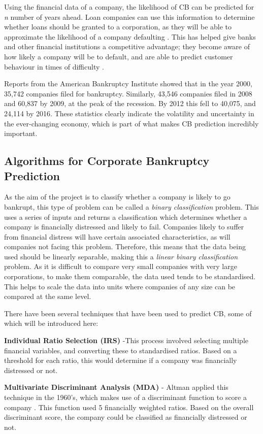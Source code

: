 \documentclass[11pt]{article}
\begin{document}
Using the financial data of a company, the likelihood of CB can be predicted for \textit{n} number of years ahead. 
Loan companies can use this information to determine whether loans should be granted to a corporation, as they will be able to approximate the likelihood of a company defaulting \cite{ref-four}. This has helped give banks and other financial institutions a competitive advantage; they become aware of how likely a company will be to default, and are able to predict customer behaviour in times of difficulty \cite{ref-four}.

Reports from the American Bankruptcy Institute \cite{ref-five} showed that in the year 2000, 35,742 companies filed for bankruptcy. Similarly, 43,546 companies filed in 2008 and 60,837 by 2009, at the peak of the recession. By 2012 this fell to 40,075, and 24,114 by 2016. These statistics clearly indicate the volatility and uncertainty in the ever-changing economy, which is part of what makes CB prediction incredibly important.
\subsection{Algorithms for Corporate Bankruptcy Prediction}\label{subsec:algos}
As the aim of the project is to classify whether a company is likely to go bankrupt, this type of problem can be called a \textit{binary classification} problem. This uses a series of inputs and returns a classification which determines whether a company is financially distressed and likely to fail. Companies likely to suffer from financial distress will have certain associated characteristics, as will companies not facing this problem. Therefore, this means that the data being used should be linearly separable, making this a \textit{linear binary classification} problem. As it is difficult to compare very small companies with very large corporations, to make them comparable, the data used tends to be standardised. This helps to scale the data into units where companies of any size can be compared at the same level. 

 There have been several techniques that have been used to predict CB, some of which will be introduced here:

\textbf{Individual Ratio Selection (IRS)} -This process involved selecting multiple financial variables, and converting these to standardised ratios. Based on a threshold for each ratio, this would determine if a company was financially distressed or not.

\textbf{Multivariate Discriminant Analysis (MDA)} - Altman applied this technique in the 1960's, which makes use of a discriminant function to score a company \cite{ref-six}. This function used 5 financially weighted ratios. Based on the overall discriminant score, the company could be classified as financially distressed or not.
\end{document}
